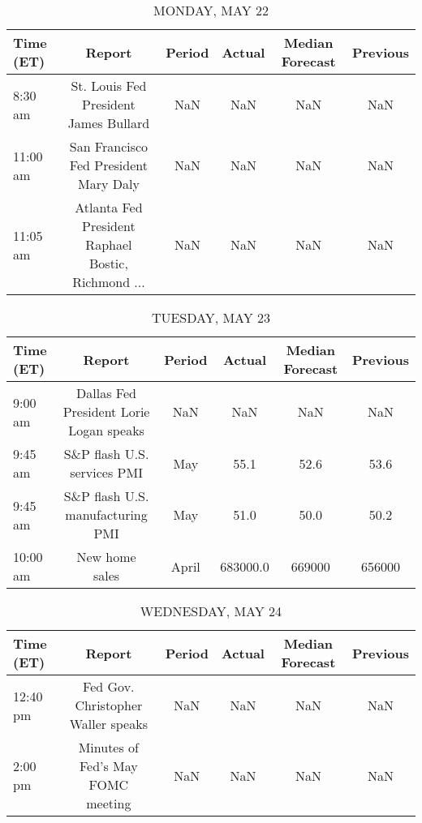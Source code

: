 \documentclass{article}%
\begin{document}
%
\normalsize%


\begin{table}[htbp]%
\caption{MONDAY, MAY 22}%
\centering%
\begin{adjustbox}{width=1\textwidth}%
\begin{tabular}{lccccc}
\toprule
Time (ET) &                                             Report & Period & Actual & Median Forecast & Previous \\
\midrule
  8:30 am &              St. Louis Fed President James Bullard &    NaN &    NaN &             NaN &      NaN \\
 11:00 am &              San Francisco Fed President Mary Daly &    NaN &    NaN &             NaN &      NaN \\
 11:05 am & Atlanta Fed President Raphael Bostic, Richmond ... &    NaN &    NaN &             NaN &      NaN \\
\bottomrule
\end{tabular}
%
\end{adjustbox}%
\end{table}

%


\begin{table}[htbp]%
\caption{TUESDAY, MAY 23}%
\centering%
\begin{adjustbox}{width=1\textwidth}%
\begin{tabular}{lccccc}
\toprule
Time (ET) &                                  Report & Period &   Actual & Median Forecast & Previous \\
\midrule
  9:00 am & Dallas Fed President Lorie Logan speaks &    NaN &      NaN &             NaN &      NaN \\
  9:45 am &             S\&P flash U.S. services PMI &    May &     55.1 &            52.6 &     53.6 \\
  9:45 am &        S\&P flash U.S. manufacturing PMI &    May &     51.0 &            50.0 &     50.2 \\
 10:00 am &                          New home sales &  April & 683000.0 &          669000 &   656000 \\
\bottomrule
\end{tabular}
%
\end{adjustbox}%
\end{table}

%


\begin{table}[htbp]%
\caption{WEDNESDAY, MAY 24}%
\centering%
\begin{adjustbox}{width=1\textwidth}%
\begin{tabular}{lccccc}
\toprule
Time (ET) &                             Report & Period & Actual & Median Forecast & Previous \\
\midrule
 12:40 pm & Fed Gov. Christopher Waller speaks &    NaN &    NaN &             NaN &      NaN \\
  2:00 pm &  Minutes of Fed's May FOMC meeting &    NaN &    NaN &             NaN &      NaN \\
\bottomrule
\end{tabular}
%
\end{adjustbox}%
\end{table}
\end{document}
